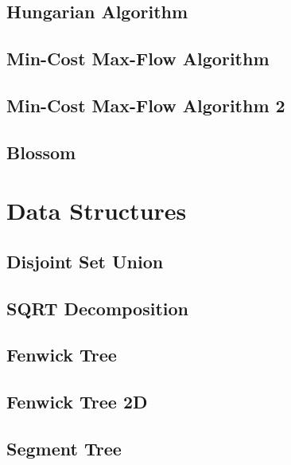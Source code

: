 \subsection{Hungarian Algorithm}
\raggedbottom
\hrulefill
\subsection{Min-Cost Max-Flow Algorithm}
\raggedbottom
\hrulefill
\subsection{Min-Cost Max-Flow Algorithm 2}
\raggedbottom
\hrulefill
\subsection{Blossom}
\raggedbottom
\hrulefill

\section{Data Structures}
\subsection{Disjoint Set Union}
\raggedbottom
\hrulefill
\subsection{SQRT Decomposition}
\raggedbottom
\hrulefill
\subsection{Fenwick Tree}
\raggedbottom
\hrulefill
\subsection{Fenwick Tree 2D}
\raggedbottom
\hrulefill
\subsection{Segment Tree}
\raggedbottom
\hrulefill
